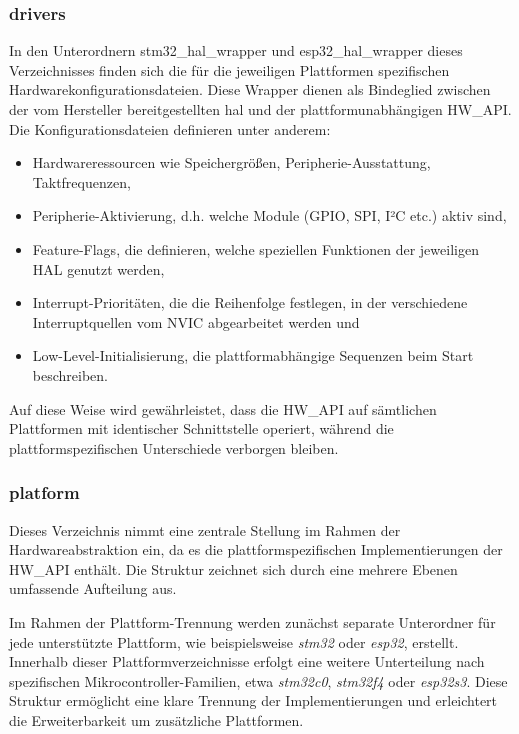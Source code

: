 \subsubsection*{drivers}
In den Unterordnern stm32\_hal\_wrapper und esp32\_hal\_wrapper dieses Verzeichnisses finden sich die für die jeweiligen Plattformen spezifischen Hardwarekonfigurationsdateien.
Diese Wrapper dienen als Bindeglied zwischen der vom Hersteller bereitgestellten \gls{hal} und der plattformunabhängigen HW\_API.
Die Konfigurationsdateien definieren unter anderem:
\begin{itemize}
	\item Hardwareressourcen wie Speichergrößen, Peripherie-Ausstattung, Taktfrequenzen,
	\item Peripherie-Aktivierung, d.h. welche Module (GPIO, SPI, I²C etc.) aktiv sind,
	\item Feature-Flags, die definieren, welche speziellen Funktionen der jeweiligen HAL genutzt werden,
	\item Interrupt-Prioritäten, die die Reihenfolge festlegen, in der verschiedene Interruptquellen vom NVIC abgearbeitet werden und
	\item Low-Level-Initialisierung, die plattformabhängige Sequenzen beim Start beschreiben.
\end{itemize}

Auf diese Weise wird gewährleistet, dass die HW\_API auf sämtlichen Plattformen mit identischer Schnittstelle operiert, während die plattformspezifischen Unterschiede verborgen bleiben.

\subsubsection*{platform}
Dieses Verzeichnis nimmt eine zentrale Stellung im Rahmen der Hardwareabstraktion ein, da es die plattformspezifischen Implementierungen der HW\_API enthält.
Die Struktur zeichnet sich durch eine mehrere Ebenen umfassende Aufteilung aus.

Im Rahmen der Plattform-Trennung werden zunächst separate Unterordner für jede unterstützte Plattform, wie beispielsweise \textit{stm32} oder \textit{esp32}, erstellt. 
Innerhalb dieser Plattformverzeichnisse erfolgt eine weitere Unterteilung nach spezifischen Mikrocontroller-Familien, etwa \textit{stm32c0}, \textit{stm32f4} oder \textit{esp32s3}. 
Diese Struktur ermöglicht eine klare Trennung der Implementierungen und erleichtert die Erweiterbarkeit um zusätzliche Plattformen.

